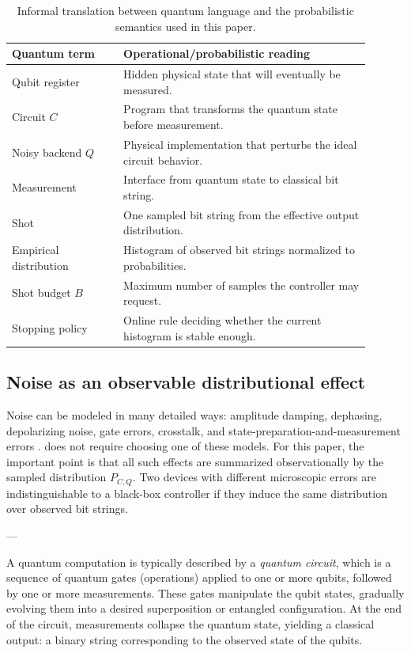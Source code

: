 \begin{table}[H]
\centering
\caption{Informal translation between quantum language and the probabilistic semantics used in this paper.}
\label{tab:translation}
\begin{tabular}{p{0.28\linewidth}p{0.62\linewidth}}
\toprule
Quantum term & Operational/probabilistic reading \\
\midrule
Qubit register & Hidden physical state that will eventually be measured. \\
Circuit $C$ & Program that transforms the quantum state before measurement. \\
Noisy backend $Q$ & Physical implementation that perturbs the ideal circuit behavior. \\
Measurement & Interface from quantum state to classical bit string. \\
Shot & One sampled bit string from the effective output distribution. \\
Empirical distribution & Histogram of observed bit strings normalized to probabilities. \\
Shot budget $B$ & Maximum number of samples the controller may request. \\
Stopping policy & Online rule deciding whether the current histogram is stable enough. \\
\bottomrule
\end{tabular}
\end{table}
 
\subsection{Noise as an observable distributional effect}
 
Noise can be modeled in many detailed ways: amplitude damping, dephasing, depolarizing noise, gate errors, crosstalk, and state-preparation-and-measurement errors \cite{preskill2018nisq,arute2019quantum}. \IncExec does not require choosing one of these models. For this paper, the important point is that all such effects are summarized observationally by the sampled distribution $P_{C,Q}$. Two devices with different microscopic errors are indistinguishable to a black-box controller if they induce the same distribution over observed bit strings.
 
---
 

A quantum computation is typically described by a \emph{quantum circuit}, which is a sequence of quantum gates (operations) applied to one or more qubits, followed by one or more measurements. These gates manipulate the qubit states, gradually evolving them into a desired superposition or entangled configuration. At the end of the circuit, measurements collapse the quantum state, yielding a classical output: a binary string corresponding to the observed state of the qubits.
 
